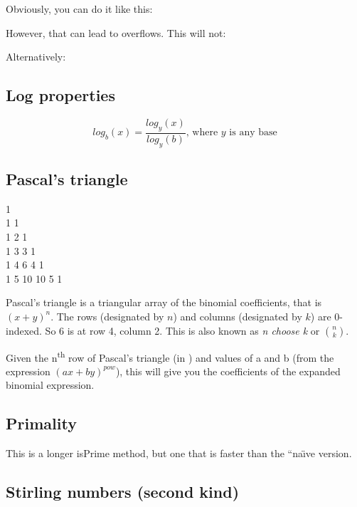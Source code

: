 Obviously, you can do it like this: 

However, that can lead to overflows. This will not: 

Alternatively: 

\subsection*{Log properties}

$$log_b(x) = \frac{log_y(x)}{log_y(b)} \text{, where } y \text{ is any base}$$

\subsection*{Pascal's triangle}

\begin{center}
1 \\
1 1 \\
1 2 1 \\
1 3 3 1 \\
1 4 6 4 1 \\
1 5 10 10 5 1
\end{center}

Pascal’s triangle is a triangular array of the binomial coefficients, that is $(x + y)^n$. The rows (designated by $n$) and columns (designated by $k$) are 0-indexed. So 6 is at row 4, column 2. This is also known as \textit{n choose k} or $\binom{n}{k}$.



Given the n\textsuperscript{th} row of Pascal's triangle (in ) and values of a and b (from the expression $(ax + by)^{pow}$), this will give you the coefficients of the expanded binomial expression.



\subsection*{Primality}

This is a longer isPrime method, but one that is faster than the “na\"{\i}ve version.



\subsection*{Stirling numbers (second kind)}

